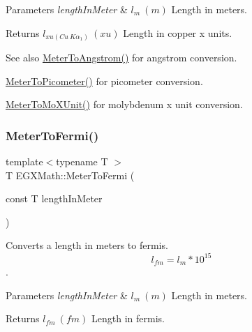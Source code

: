 \begin{DoxyParams}{Parameters}
{\em length\+In\+Meter} & $ l_{m}\ (m)$ Length in meters. \\
\hline
\end{DoxyParams}
\begin{DoxyReturn}{Returns}
$ l_{xu(Cu\ K\alpha_1)}\ (xu)$ Length in copper x units. 
\end{DoxyReturn}
\begin{DoxySeeAlso}{See also}
\mbox{\hyperlink{group___e_g_x_math-_conversions-_length_conversions-_s_i-_meter-_non-_s_i_ga9e6d5040f58d167bd7a4b6cebb5527ee}{Meter\+To\+Angstrom()}} for angstrom conversion. 

\mbox{\hyperlink{group___e_g_x_math-_conversions-_length_conversions-_s_i-_meter-_s_i_ga5e136454c20254062d6e8637cfbfb8ee}{Meter\+To\+Picometer()}} for picometer conversion. 

\mbox{\hyperlink{group___e_g_x_math-_conversions-_length_conversions-_s_i-_meter-_non-_s_i_gae0351200a3d90c4efe741c6057b2fd4b}{Meter\+To\+Mo\+X\+Unit()}} for molybdenum x unit conversion. 
\end{DoxySeeAlso}
\mbox{\label{group___e_g_x_math-_conversions-_length_conversions-_s_i-_meter-_non-_s_i_ga2cf89a4a80da02e3e3c82e844095acfe}} 
\subsubsection{\texorpdfstring{Meter\+To\+Fermi()}{MeterToFermi()}}
{\footnotesize\ttfamily template$<$typename T $>$ \\
T E\+G\+X\+Math\+::\+Meter\+To\+Fermi (\begin{DoxyParamCaption}\item[{const T}]{length\+In\+Meter }\end{DoxyParamCaption})}



Converts a length in meters to fermis. \[ l_{fm}=l_{m} * 10^{15} \]. 


\begin{DoxyParams}{Parameters}
{\em length\+In\+Meter} & $ l_{m}\ (m)$ Length in meters. \\
\hline
\end{DoxyParams}
\begin{DoxyReturn}{Returns}
$ l_{fm}\ (fm)$ Length in fermis. 
\end{DoxyReturn}
\mbox{\label{group___e_g_x_math-_conversions-_length_conversions-_s_i-_meter-_non-_s_i_ga9655833d43ede59b17c54a6f06f9681a}} 
